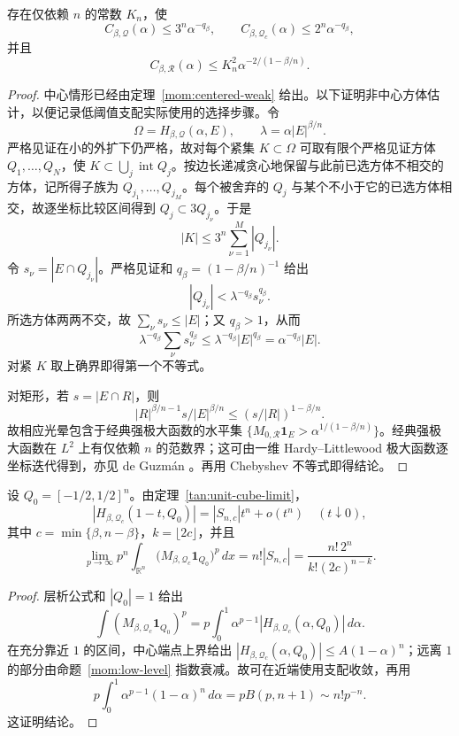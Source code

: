 \begin{proposition}[全域低阈值支配]\label{mom:low-level}
存在仅依赖 $n$ 的常数 $K_n$，使
\[
 C_{\beta,\mathcal Q}(\alpha)\le3^n\alpha^{-q_\beta},\qquad
 C_{\beta,\mathcal Q_c}(\alpha)\le2^n\alpha^{-q_\beta},
\]
并且
\[
 C_{\beta,\mathcal R}(\alpha)
 \le K_n^2\alpha^{-2/(1-\beta/n)}.
\]
\end{proposition}
\begin{proof}
中心情形已经由定理~\ref{mom:centered-weak} 给出。以下证明非中心方体估计，以便记录低阈值支配实际使用的选择步骤。令
\[
 \Omega=H_{\beta,\mathcal Q}(\alpha,E),\qquad
 \lambda=\alpha|E|^{\beta/n}.
\]
严格见证在小的外扩下仍严格，故对每个紧集 $K\subset\Omega$ 可取有限个严格见证方体 $Q_1,\ldots,Q_N$，使 $K\subset\bigcup_j\operatorname{int}Q_j$。按边长递减贪心地保留与此前已选方体不相交的方体，记所得子族为 $Q_{j_1},\ldots,Q_{j_M}$。每个被舍弃的 $Q_j$ 与某个不小于它的已选方体相交，故逐坐标比较区间得到 $Q_j\subset3Q_{j_\nu}$。于是
\[
 |K|\le3^n\sum_{\nu=1}^M|Q_{j_\nu}|.
\]
令 $s_\nu=|E\cap Q_{j_\nu}|$。严格见证和 $q_\beta=(1-\beta/n)^{-1}$ 给出
\[
 |Q_{j_\nu}|<\lambda^{-q_\beta}s_\nu^{q_\beta}.
\]
所选方体两两不交，故 $\sum_\nu s_\nu\le|E|$；又 $q_\beta>1$，从而
\[
 \lambda^{-q_\beta}\sum_\nu s_\nu^{q_\beta}
 \le\lambda^{-q_\beta}|E|^{q_\beta}
 =\alpha^{-q_\beta}|E|.
\]
对紧 $K$ 取上确界即得第一个不等式。

对矩形，若 $s=|E\cap R|$，则
\[
 |R|^{\beta/n-1}s/|E|^{\beta/n}
 \le(s/|R|)^{1-\beta/n}.
\]
故相应光晕包含于经典强极大函数的水平集 $\{M_{0,\mathcal R}\mathbf1_E>\alpha^{1/(1-\beta/n)}\}$。经典强极大函数在 $L^2$ 上有仅依赖 $n$ 的范数界；这可由一维 Hardy--Littlewood 极大函数逐坐标迭代得到，亦见 de Guzm\'an \cite{deGuzman1975}。再用 Chebyshev 不等式即得结论。
\end{proof}

\begin{theorem}[固定方体的高矩首项]\label{mom:fixed-cube-moment}
设 $Q_0=[-1/2,1/2]^n$。由定理~\ref{tan:unit-cube-limit}，
\[
 |H_{\beta,\mathcal Q_c}(1-t,Q_0)|=|S_{n,c}|t^n+o(t^n)\quad(t\downarrow0),
\]
其中 $c=\min\{\beta,n-\beta\}$，$k=\lfloor2c\rfloor$，并且
\begin{equation}
 \lim_{p\to\infty}p^n\int_{\mathbb R^n}
 \bigl(M_{\beta,\mathcal Q_c}\mathbf1_{Q_0}\bigr)^p\,dx
 =n!|S_{n,c}|=
 \frac{n!\,2^n}{k!(2c)^{n-k}}.
 \label{mom:fixed-cube-asymptotic}
\end{equation}
\end{theorem}
\begin{proof}
层析公式和 $|Q_0|=1$ 给出
\[
 \int(M_{\beta,\mathcal Q_c}\mathbf1_{Q_0})^p
 =p\int_0^1\alpha^{p-1}|H_{\beta,\mathcal Q_c}(\alpha,Q_0)|\,d\alpha.
\]
在充分靠近 $1$ 的区间，中心端点上界给出 $|H_{\beta,\mathcal Q_c}(\alpha,Q_0)|\le A(1-\alpha)^n$；远离 $1$ 的部分由命题~\ref{mom:low-level} 指数衰减。故可在近端使用支配收敛，再用
\[
 p\int_0^1\alpha^{p-1}(1-\alpha)^n\,d\alpha=pB(p,n+1)\sim n!p^{-n}.
\]
这证明结论。
\end{proof}

